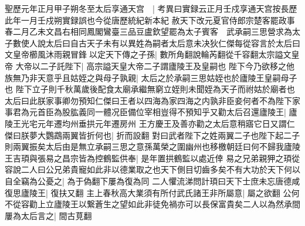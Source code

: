 聖歷元年正月甲子朔冬至太后享通天宫　|{
	考異曰實録云正月壬戍享通天宫按長歷此年一月壬戍朔實録誤也今從唐歷統紀新本紀}
赦天下改元夏官侍郎宗楚客罷政事　春二月乙未文昌右相同鳳閣鸞臺三品豆盧欽望罷為太子賓客　武承嗣三思營求為太子數使人說太后曰自古天子未有以異姓為嗣者太后意未决狄仁傑每從容言於太后曰文皇帝櫛風沐雨親冒鋒以定天下傳之子孫|{
	數所角翻說輪芮翻從千容翻太宗謚文皇帝}
大帝以二子託陛下|{
	高宗謚天皇大帝二子謂廬陵王及皇嗣也}
陛下今乃欲移之他族無乃非天意乎且姑姪之與母子孰親|{
	太后之於承嗣三思姑姪也於廬陵王皇嗣母子也}
陛下立子則千秋萬歲後配食太廟承繼無窮立姪則未聞姪為天子而祔姑於廟者也太后曰此朕家事卿勿預知仁傑曰王者以四海為家四海之内孰非臣妾何者不為陛下家事君為元首臣為股肱義同一體况臣備位宰相豈得不預知乎又勸太后召還廬陵王|{
	廬陵王光宅元年遷均州垂拱元年遷房州}
王方慶王及善亦勸之太后意稍寤它日又謂仁傑曰朕夢大鸚鵡兩翼皆折何也|{
	折而設翻}
對曰武者陛下之姓兩翼二子也陛下起二子則兩翼振矣太后由是無立承嗣三思之意孫萬榮之圍幽州也移檄朝廷曰何不歸我廬陵王吉頊與張易之昌宗皆為控鶴監供奉|{
	是年置拱鶴監以處近倖}
易之兄弟親狎之頊從容說二人曰公兄弟貴寵如此非以德業取之也天下側目切齒多矣不有大功於天下何以自全竊為公憂之|{
	為于偽翻下屢為復為同}
二人懼流涕問計頊曰天下士庶未忘唐德咸復思廬陵王|{
	復扶又翻}
主上春秋高大業須有所付武氏諸王非所屬意|{
	屬之欲翻}
公何不從容勸上立廬陵王以繋蒼生之望如此非徒免禍亦可以長保富貴矣二人以為然承間屢為太后言之|{
	間古莧翻}
